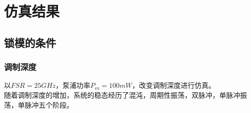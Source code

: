 \chapter{仿真结果}
\label{chap:model2}

\fontsize{12bp}{14.4pt}

\section{锁模的条件}
\subsection{调制深度}
以$FSR = 25GHz$，泵浦功率$P_{in} = 100mW$，改变调制深度进行仿真。\\
随着调制深度的增加，系统的稳态经历了混沌，周期性振荡，双脉冲，单脉冲振荡，单脉冲五个阶段。
